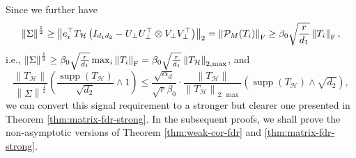 \documentclass[12pt]{article}
\newcommand{\tF}{{\rm F}}
\newcommand{\norm}[1]{\left\lVert#1\right\rVert}
\newcommand{\cP}{\mathcal{P}}
\def\calH{{\mathcal H}}
\theoremstyle{plain}
\begin{document}
Since we further have 
\begin{equation*}
    \begin{aligned}
        \norm{ \Sigma }^{\frac{1}{2}} \ge \norm{e_i^\top T_{\calH}\left(I_{d_1 d_2} -  U_\perp U_\perp^\top \otimes V_\perp V_\perp^\top\right)  }_2 =\norm{\cP_M(T_i)}_\tF \ge \beta_0\sqrt{\frac{r}{d_1}} \norm{T_i}_\tF,
    \end{aligned}
\end{equation*}
i.e., $ \norm{ \Sigma }^{\frac{1}{2}}  \ge \beta_0\sqrt{\frac{r}{d_1}}\max_{i}\norm{T_i}_\tF= \beta_0\sqrt{\frac{r}{d_1}} \norm{T_{\calH}}_{2,\max} $, and 
\begin{equation*}
    \frac{  \norm{T_{\calH} }  }{ \norm{ \Sigma }^{\frac{1}{2}}  } \left( \frac{\operatorname{supp}(T_{\calH} )}{\sqrt{d_2}}\wedge 1 \right) \le \frac{\sqrt{\alpha_d }}{\sqrt{r}\beta_0}\cdot \frac{  \norm{T_{\calH} } }{ \norm{T_{\calH} }_{2,\max} } \left( \operatorname{supp}(T_{\calH} ) \wedge \sqrt{d_2} \right),
\end{equation*}
we can convert this signal requirement to a stronger but clearer one presented in Theorem \ref{thm:matrix-fdr-strong}. In the subsequent proofs, we shall prove the non-asymptotic versions of Theorem \ref{thm:weak-cor-fdr} and \ref{thm:matrix-fdr-strong}. 
\end{document}
